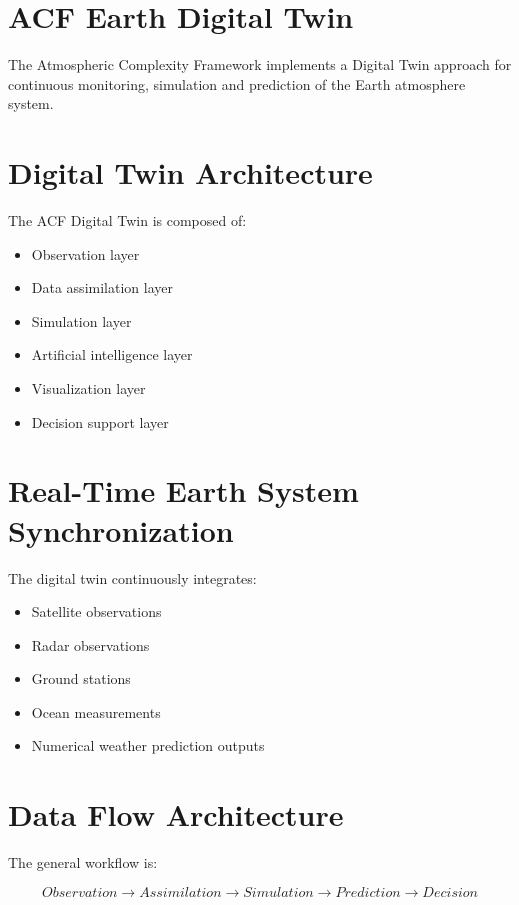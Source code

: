 \section{ACF Earth Digital Twin}

The Atmospheric Complexity Framework implements a Digital Twin
approach for continuous monitoring, simulation and prediction of
the Earth atmosphere system.


\section{Digital Twin Architecture}

The ACF Digital Twin is composed of:

\begin{itemize}
\item Observation layer
\item Data assimilation layer
\item Simulation layer
\item Artificial intelligence layer
\item Visualization layer
\item Decision support layer
\end{itemize}



\section{Real-Time Earth System Synchronization}

The digital twin continuously integrates:

\begin{itemize}
\item Satellite observations
\item Radar observations
\item Ground stations
\item Ocean measurements
\item Numerical weather prediction outputs
\end{itemize}



\section{Data Flow Architecture}

The general workflow is:

\begin{equation}
Observation
\rightarrow
Assimilation
\rightarrow
Simulation
\rightarrow
Prediction
\rightarrow
Decision
\end{equation}



